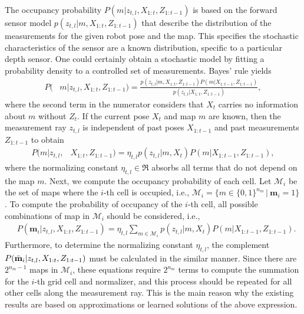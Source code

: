 The occupancy probability $P(m|z_{t,l},X_{1:t},Z_{1:t-1})$ is based on the forward sensor model $p(z_{t,l}|m,X_{1:t},Z_{1:t-1})$ that describe the distribution of the measurements for the given robot pose and the map. This specifies the stochastic characteristics of the sensor are a known distribution, specific to a particular depth sensor. One could certainly obtain a stochastic model by fitting a probability density to a controlled set of measurements. Bayes' rule yields
\begin{align}
\label{eqn:BayesRuleRayISM}
P(&m|z_{t,l},X_{1:t},Z_{1:t-1})%
=\frac{p(z_{t,l}|m,X_{1:t},Z_{1:t-1})P(m|X_{1:t-1},Z_{1:t-1})}{p(z_{t,l}|X_{1:t},Z_{1:t-1})},
\end{align}
where the second term in the numerator considers that $X_t$ carries no information about $m$ without $Z_t$.
If the current pose $X_t$ and map $m$ are known, then the measurement ray $z_{t,l}$ is independent of past poses $X_{1:t-1}$ and past measurements $Z_{1:t-1}$ to obtain
\begin{align}
P(m|z_{t,l},&X_{1:t},Z_{1:t-1})%
=\eta_{t,l}p(z_{t,l}|m,X_{t})P(m|X_{1:t-1},Z_{1:t-1}),
\end{align}
where the normalizing constant $\eta_{t,l}\in\Re$ absorbs all terms that do not depend on the map $m$.
Next, we compute the occupancy probability of each cell. Let $\mathcal{M}_i$ be the set of maps where the $i$-th cell is occupied, i.e., $\mathcal{M}_i =\{m\in\{0,1\}^{{n_m}}\,|\ \mathbf{m}_i=1\}$. To compute the probability of occupancy of the $i$-th cell, all possible combinations of map in $\mathcal{M}_i$ should be considered, i.e., 
\begin{align}
\label{eqn:InvSenModWithProbDens}
&P(\mathbf{m}_i|z_{t,l},X_{1:t},Z_{1:t-1})%
=\eta_{t,l}\sum_{m\in\mathcal{M}_i}p(z_{t,l}|m,X_{t})P(m|X_{1:t-1},Z_{1:t-1}).
\end{align}
Furthermore, to determine the normalizing constant $\eta_{t,l}$, the complement $\\P(\bar{\mathbf{m}}_i|z_{t,l},X_{1:t},Z_{1:t-1})$ must be calculated in the similar manner. Since there are $2^{n_{m}-1}$ maps in $\mathcal{M}_i$, these equations require $2^{n_m}$ terms to compute the summation for the $i$-th grid cell and normalizer, and this process should be repeated for all other cells along the measurement ray. This is the main reason why the existing results are based on approximations or learned solutions of the above expression. 

